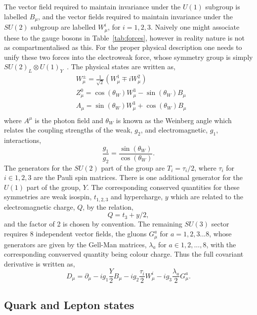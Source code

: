 The vector field required to maintain invariance under the $U(1)$ subgroup is labelled $B_{\mu}$, and the vector fields required to maintain invariance under the $SU(2)$ subgroup are labelled $W^{i}_{\mu}$, for $i=1,2,3$. Naively one might associate these to the \SM gauge bosons in Table~\ref{tab:forces}, however in reality nature is not as compartmentalised as this. For the proper physical description one needs to unify these two forces into the electroweak force, whose symmetry group is simply $SU(2)_{L}\otimes U(1)_{Y}$~\cite{Glashow,Weinberg,Salam}.  The physical states are written as,
\begin{align}
  & W_{\mu}^{\pm} = \frac{1}{\sqrt{2}}(W^{1}_{\mu}\mp iW^{2}_{\mu})\\
  & Z_{\mu}^{0} = \cos(\theta_{W})W^{3}_{\mu}-\sin(\theta_{W})B_{\mu}\\
  & A_{\mu} = \sin(\theta_{W})W^{3}_{\mu}+\cos(\theta_{W})B_{\mu}\\
\end{align}
where $A^{\mu}$ is the photon field and $\theta_{W}$ is known as the Weinberg angle which relates the coupling strengths of the weak, $g_{2}$, and electromagnetic, $g_{1}$, interactions,
\begin{equation}
  \frac{g_{1}}{g_{2}} = \frac{\sin(\theta_{W})}{\cos(\theta_{W})}.
\end{equation}
The generators for the $SU(2)$ part of the group are $T_{i}=\tau_{i}/2$, where $\tau_{i}$ for $i\in{1,2,3}$ are the Pauli spin matrices. There is one additional generator for the $U(1)$ part of the group, $Y$. The corresponding conserved quantities for these symmetries are weak isospin, $t_{1,2,3}$ and hypercharge, $y$ which are related to the electromagnetic charge, $Q$, by the relation, 
\begin{equation}
  Q = t_{3}+y/2,
\end{equation}
 and the factor of 2 is chosen by convention. The remaining $SU(3)$ sector requires 8 independent vector fields, the gluons $G_{\mu}^{a}$ for $a=1,2,3...8$, whose generators are given by the Gell-Man matrices, $\lambda_{a}$ for $a\in{1,2,...,8}$, with the corresponding convserved quantity being colour charge. Thus the full covariant derivative is written as,
\begin{equation}
  D_{\mu} = \partial_{\mu}-ig_{1}\frac{Y}{2}B_{\mu} -ig_{2}\frac{\tau_{i}}{2}W_{\mu}^{i} -ig_{3}\frac{\lambda_{a}}{2}G_{\mu}^{a}.
  \label{eq:cov_der}
\end{equation}

\subsection{Quark and Lepton states}

